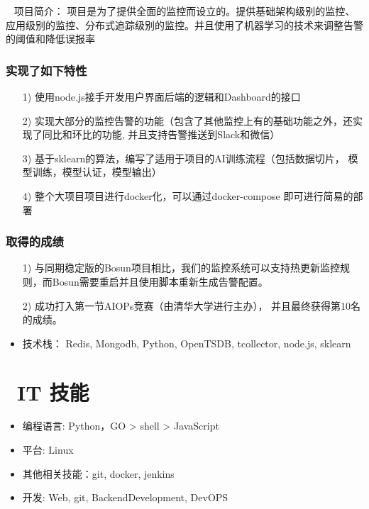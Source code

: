 \documentclass{resume}
\begin{document}
 \textperiodcentered\ 
项目简介： 项目是为了提供全面的监控而设立的。提供基础架构级别的监控、应用级别的监控、分布式追踪级别的监控。并且使用了机器学习的技术来调整告警的阈值和降低误报率
    \subsubsection{\textbf {实现了如下特性}}
    \begin{itemize}
        \item [1)]
            使用node.js接手开发用户界面后端的逻辑和Dashboard的接口
        \item [2)]
            实现大部分的监控告警的功能（包含了其他监控上有的基础功能之外，还实现了同比和环比的功能, 并且支持告警推送到Slack和微信）
        \item [3)]   
            基于sklearn的算法，编写了适用于项目的AI训练流程（包括数据切片， 模型训练，模型认证，模型输出） 
        \item [4)] 
            整个大项目项目进行docker化，可以通过docker-compose 即可进行简易的部署
    \end{itemize}
    \subsubsection{\textbf {取得的成绩}}
    \begin{itemize}
        \item [1)]
            与同期稳定版的Bosun项目相比，我们的监控系统可以支持热更新监控规则，而Bosun需要重启并且使用脚本重新生成告警配置。
        \item [2)] 
            成功打入第一节AIOPs竞赛（由清华大学进行主办）， 并且最终获得第10名的成绩。
    \end{itemize}
    \begin{itemize}
    \item 技术栈： Redis, Mongodb, Python, OpenTSDB, tcollector, node.js, sklearn
    \end{itemize}

\section{\faCogs\ IT 技能}
\begin{itemize}[parsep=0.5ex]
  \item 编程语言: Python，GO > shell > JavaScript
  \item 平台: Linux
  \item 其他相关技能：git, docker, jenkins
  \item 开发: Web, git, BackendDevelopment, DevOPS
\end{itemize}
\end{document}
